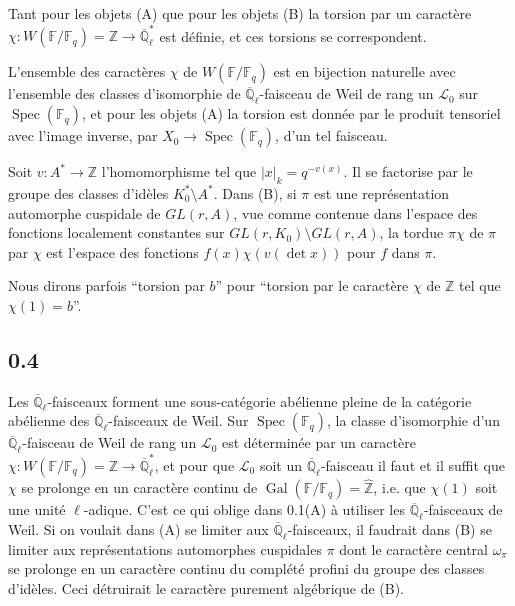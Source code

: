 \documentclass[11pt,a4paper]{article}
\theoremstyle{plain}
\theoremstyle{definition}
\DeclareMathOperator{\Spec}{Spec}
\DeclareMathOperator{\Gal}{Gal}
\begin{document}
Tant pour les objets (A) que pour les objets (B) la torsion par un caract\`ere $\chi: W(\mathbb{F}/\mathbb{F}_q) = \mathbb{Z} \to \overline{\mathbb{Q}}_\ell^*$ est d\'efinie, et ces torsions se correspondent.

L'ensemble des caract\`eres $\chi$ de $W(\mathbb{F}/\mathbb{F}_q)$ est en bijection naturelle avec l'ensemble des classes d'isomorphie de $\overline{\mathbb{Q}}_\ell$-faisceau de Weil de rang un $\mathcal{L}_0$ sur $\Spec(\mathbb{F}_q)$, et pour les objets (A) la torsion est donn\'ee par le produit tensoriel avec l'image inverse, par $X_0 \to \Spec(\mathbb{F}_q)$, d'un tel faisceau.

Soit $v: A^* \to \mathbb{Z}$ l'homomorphisme tel que $|x|_k = q^{-v(x)}$. Il se factorise par le groupe des classes d'id\`eles $K_0^* \setminus A^*$. Dans (B), si $\pi$ est une repr\'esentation automorphe cuspidale de $GL(r,A)$, vue comme contenue dans l'espace des fonctions localement constantes sur $GL(r,K_0) \setminus GL(r,A)$, la tordue $\pi\chi$ de $\pi$ par $\chi$ est l'espace des fonctions $f(x)\chi(v(\det x))$ pour $f$ dans $\pi$.

Nous dirons parfois ``torsion par $b$'' pour ``torsion par le caract\`ere $\chi$ de $\mathbb{Z}$ tel que $\chi(1)=b$''.

\subsection*{0.4}

Les $\overline{\mathbb{Q}}_\ell$-faisceaux forment une sous-cat\'egorie ab\'elienne pleine de la cat\'egorie ab\'elienne des $\overline{\mathbb{Q}}_\ell$-faisceaux de Weil. Sur $\Spec(\mathbb{F}_q)$, la classe d'isomorphie d'un $\overline{\mathbb{Q}}_\ell$-faisceau de Weil de rang un $\mathcal{L}_0$ est d\'etermin\'ee par un caract\`ere $\chi: W(\mathbb{F}/\mathbb{F}_q) = \mathbb{Z} \to \overline{\mathbb{Q}}_\ell^*$, et pour que $\mathcal{L}_0$ soit un $\overline{\mathbb{Q}}_\ell$-faisceau il faut et il suffit que $\chi$ se prolonge en un caract\`ere continu de $\Gal(\mathbb{F}/\mathbb{F}_q) = \hat{\mathbb{Z}}$, i.e. que $\chi(1)$ soit une unit\'e $\ell$-adique. C'est ce qui oblige dans 0.1(A) \`a utiliser les $\overline{\mathbb{Q}}_\ell$-faisceaux de Weil. Si on voulait dans (A) se limiter aux $\overline{\mathbb{Q}}_\ell$-faisceaux, il faudrait dans (B) se limiter aux repr\'esentations automorphes cuspidales $\pi$ dont le caract\`ere central $\omega_\pi$ se prolonge en un caract\`ere continu du compl\'et\'e profini du groupe des classes d'id\`eles. Ceci d\'etruirait le caract\`ere purement alg\'ebrique de (B).
\end{document}
